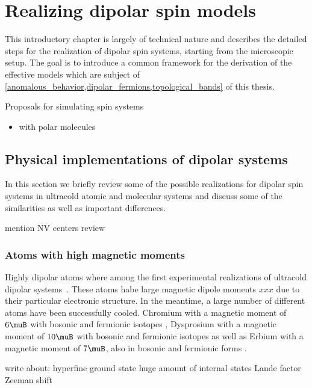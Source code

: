 \chapter{Realizing dipolar spin models}
\label{dipolar_spinmodels}

This introductory chapter is largely of technical nature and describes the detailed steps for the realization of dipolar spin systems, starting from the microscopic setup.
The goal is to introduce a common framework for the derivation of the effective models which are subject of \cref{anomalous_behavior,dipolar_fermions,topological_bands} of this thesis.

Proposals for simulating spin systems
\begin{itemize}
    \item with polar molecules \cite{Micheli2006,Hauke2010,Gorshkov2011,Gorshkov2011b,Peter2012b,Syzranov2014,Peter2014}
\end{itemize}


\section{Physical implementations of dipolar systems}

In this section we briefly review some of the possible realizations for dipolar spin
systems in ultracold atomic and molecular systems and discuss some of the similarities as well as important differences.

mention NV centers
review \cite{Lahaye2009}

\subsection{Atoms with high magnetic moments}

Highly dipolar atoms where among the first experimental realizations
of ultracold dipolar systems~\cite{Griesmaier2005a}. These atoms habe
large magnetic dipole moments $xxx$ due to their particular electronic
structure. In the meantime, a large number of different atoms have been
successfully cooled. Chromium with a magnetic moment of $6\muB$ with
bosonic \cite{Griesmaier2005a,Beaufils2008} and fermionic isotopes
\cite{Naylor2015}, Dysprosium with a magnetic moment of $10\muB$
with bosonic \cite{Lu2011} and fermionic isotopes \cite{Lu2012} as
well as Erbium with a magnetic moment of $7\muB$, also in bosonic
\cite{Aikawa2012} and fermionic forms \cite{Aikawa2014}.


write about:
hyperfine ground state
huge amount of internal states
Lande factor
Zeeman shift


